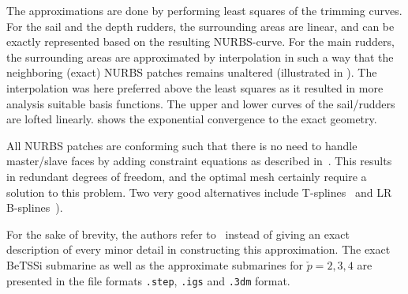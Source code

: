 The approximations are done by performing least squares of the trimming curves. For the sail and the depth rudders, the surrounding areas are linear, and can be exactly represented based on the resulting NURBS-curve. For the main rudders, the surrounding areas are approximated by interpolation in such a way that the neighboring (exact) NURBS patches remains unaltered (illustrated in ). The interpolation was here preferred above the least squares as it resulted in more analysis suitable basis functions. The upper and lower curves of the sail/rudders are lofted linearly.  shows the exponential convergence to the exact geometry.

All NURBS patches are conforming such that there is no need to handle master/slave faces by adding constraint equations as described in~\cite[p. 87-91]{Cottrell2006iao}. This results in redundant degrees of freedom, and the optimal mesh certainly require a solution to this problem. Two very good alternatives include T-splines~\cite{Scott2011tsa} and LR B-splines~\cite{Johannessen2014iau}).

For the sake of brevity, the authors refer to~\cite{Venaas2019bts} instead of giving an exact description of every minor detail in constructing this approximation. The exact BeTSSi submarine as well as the approximate submarines for $\check{p}=2,3,4$ are presented in the file formats \texttt{.step}, \texttt{.igs} and \texttt{.3dm} format. 

